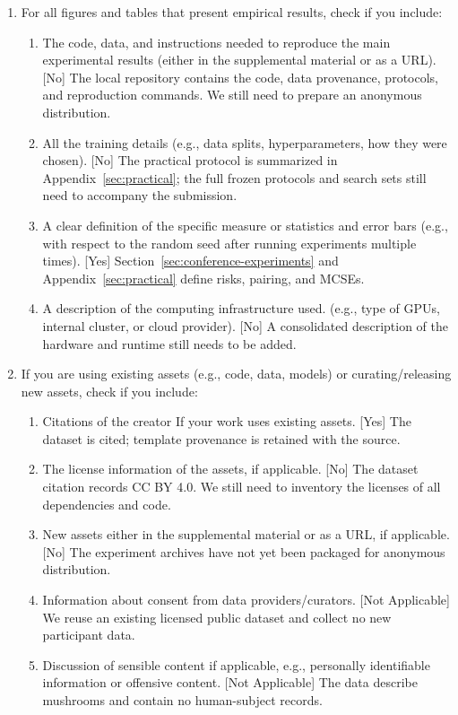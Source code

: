 \begin{enumerate}
  \item For all figures and tables that present empirical results, check if you
        include:
        \begin{enumerate}
          \item The code, data, and instructions needed to reproduce the main
                experimental results (either in the supplemental material or as
                a URL). [No] The local repository contains the code, data
                provenance, protocols, and reproduction commands. We still need
                to prepare an anonymous distribution.
          \item All the training details (e.g., data splits, hyperparameters,
                how they were chosen). [No] The practical protocol is summarized
                in Appendix~\ref{sec:practical}; the full frozen protocols and
                search sets still need to accompany the submission.
          \item A clear definition of the specific measure or statistics and
                error bars (e.g., with respect to the random seed after running
                experiments multiple times). [Yes]
                Section~\ref{sec:conference-experiments} and
                Appendix~\ref{sec:practical} define risks, pairing, and MCSEs.
          \item A description of the computing infrastructure used. (e.g., type
                of GPUs, internal cluster, or cloud provider). [No] A
                consolidated description of the hardware and runtime still
                needs to be added.
        \end{enumerate}

  \item If you are using existing assets (e.g., code, data, models) or
        curating/releasing new assets, check if you include:
        \begin{enumerate}
          \item Citations of the creator If your work uses existing assets.
                [Yes] The dataset is cited; template provenance is retained with
                the source.
          \item The license information of the assets, if applicable. [No] The
                dataset citation records CC BY 4.0. We still need to inventory
                the licenses of all dependencies and code.
          \item New assets either in the supplemental material or as a URL, if
                applicable. [No] The experiment archives have not yet been
                packaged for anonymous distribution.
          \item Information about consent from data providers/curators. [Not
                Applicable] We reuse an existing licensed public dataset and
                collect no new participant data.
          \item Discussion of sensible content if applicable, e.g., personally
                identifiable information or offensive content. [Not Applicable]
                The data describe mushrooms and contain no human-subject
                records.
        \end{enumerate}


\end{enumerate}
